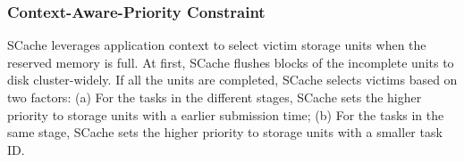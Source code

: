 \subsubsection{Context-Aware-Priority Constraint}
{\color{blue}
SCache leverages application context to select victim storage units when the reserved memory is full.
At first, SCache flushes blocks of the incomplete units to disk cluster-widely.
If all the units are completed, SCache selects victims based on two factors: 
(a) For the tasks in the different stages, SCache sets the higher priority to storage units with a earlier submission time;
(b) For the tasks in the same stage, SCache sets the higher priority to storage units with a smaller task ID.
}



